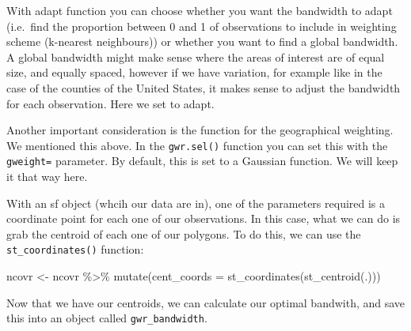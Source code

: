 \documentclass[
  krantz2]{krantz}
\makeatletter
\newenvironment{Shaded}{\begin{snugshade}}{\end{snugshade}}
\newcommand{\AttributeTok}[1]{\textcolor[rgb]{0.61,0.61,0.61}{#1}}
\newcommand{\FunctionTok}[1]{\textcolor[rgb]{0,0,0}{#1}}
\newcommand{\NormalTok}[1]{#1}
\newcommand{\OtherTok}[1]{\textcolor[rgb]{0.37,0.37,0.37}{#1}}
\newcommand{\SpecialCharTok}[1]{\textcolor[rgb]{0,0,0}{#1}}
\newenvironment{kframe}{%
\medskip{}
\setlength{\fboxsep}{.8em}
 \def\at@end@of@kframe{}%
 \ifinner\ifhmode%
  \def\at@end@of@kframe{\end{minipage}}%
  \begin{minipage}{\columnwidth}%
 \fi\fi%
 \def\FrameCommand##1{\hskip\@totalleftmargin \hskip-\fboxsep
 \colorbox{shadecolor}{##1}\hskip-\fboxsep
     \hskip-\linewidth \hskip-\@totalleftmargin \hskip\columnwidth}%
 \MakeFramed {\advance\hsize-\width
   \@totalleftmargin\z@ \linewidth\hsize
   \@setminipage}}%
 {\par\unskip\endMakeFramed%
 \at@end@of@kframe}
\renewenvironment{Shaded}{\begin{kframe}}{\end{kframe}}
\makeatother
\begin{document}
With adapt function you can choose whether you want the bandwidth to adapt (i.e.~find the proportion between 0 and 1 of observations to include in weighting scheme (k-nearest neighbours)) or whether you want to find a global bandwidth. A global bandwidth might make sense where the areas of interest are of equal size, and equally spaced, however if we have variation, for example like in the case of the counties of the United States, it makes sense to adjust the bandwidth for each observation. Here we set to adapt.

Another important consideration is the function for the geographical weighting. We mentioned this above. In the \texttt{gwr.sel()} function you can set this with the \texttt{gweight=} parameter. By default, this is set to a Gaussian function. We will keep it that way here.

With an sf object (whcih our data are in), one of the parameters required is a coordinate point for each one of our observations. In this case, what we can do is grab the centroid of each one of our polygons. To do this, we can use the \texttt{st\_coordinates()} function:

\begin{Shaded}
\begin{Highlighting}[]
\NormalTok{ncovr }\OtherTok{\textless{}{-}}\NormalTok{ ncovr }\SpecialCharTok{\%\textgreater{}\%} 
  \FunctionTok{mutate}\NormalTok{(}\AttributeTok{cent\_coords =} \FunctionTok{st\_coordinates}\NormalTok{(}\FunctionTok{st\_centroid}\NormalTok{(.)))}
\end{Highlighting}
\end{Shaded}

Now that we have our centroids, we can calculate our optimal bandwith, and save this into an object called \texttt{gwr\_bandwidth}.

\begin{Shaded}
\end{Shaded}
\end{document}
